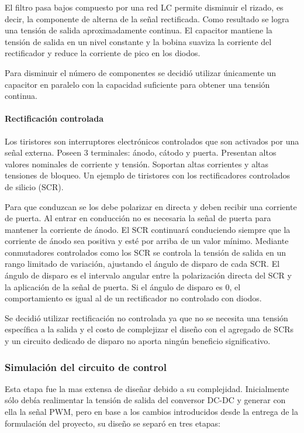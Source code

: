 El filtro pasa bajos compuesto por una red LC permite disminuir el rizado, es decir, la componente de alterna de la señal rectificada. 
Como resultado se logra una tensión de salida aproximadamente continua.
El capacitor mantiene la tensión de salida en un nivel constante y la bobina suaviza la corriente del rectificador y reduce la corriente de pico en los diodos. 

Para disminuir el número de componentes se decidió utilizar únicamente un capacitor en paralelo con la capacidad suficiente para obtener una tensión continua.

\paragraph{Rectificación controlada}

Los tiristores son interruptores electrónicos controlados que son activados por una señal externa. 
Poseen 3 terminales: ánodo, cátodo y puerta. Presentan altos valores nominales de corriente y tensión.
Soportan altas corrientes y altas tensiones de bloqueo. 
Un ejemplo de tiristores con los rectificadores controlados de silicio (SCR).

Para que conduzcan se los debe polarizar en directa y deben recibir una corriente de puerta. 
Al entrar en conducción no es necesaria la señal de puerta para mantener la corriente de ánodo. 
El SCR continuará conduciendo siempre que la corriente de ánodo sea positiva y esté por arriba de un valor mínimo. 
Mediante conmutadores controlados como los SCR se controla la tensión de salida en un rango limitado de variación,
ajustando el ángulo de disparo de cada SCR. 
El ángulo de disparo es el intervalo angular entre la polarización directa del SCR y la aplicación de la señal de puerta. 
Si el ángulo de disparo es 0, el comportamiento es igual al de un rectificador no controlado con diodos. 

Se decidió utilizar rectificación no controlada ya que no se necesita una tensión específica a la salida
y el costo de complejizar el diseño con el agregado de SCRs
y un circuito dedicado de disparo no aporta ningún beneficio significativo.

\subsubsection{Simulación del circuito de control}
Esta etapa fue la mas extensa de diseñar debido a su complejidad.
Inicialmente sólo debía realimentar la tensión de salida del conversor DC-DC
y generar con ella la señal PWM, pero en base a los cambios introducidos desde
la entrega de la formulación del proyecto, su diseño se separó en tres etapas:

